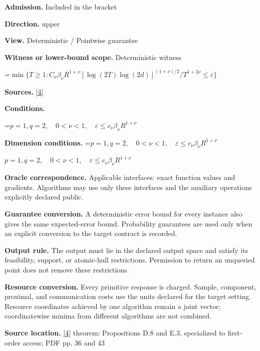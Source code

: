 \documentclass[10pt,a4paper]{article}
\newcommand{\AtlasMath}[1]{\par\begingroup\centering\setbox0=\hbox{$\displaystyle #1$}\ifdim\wd0>1.4\linewidth\typeout{ATLAS WIDE FORMULA: \the\wd0}\fi\ifdim\wd0>\linewidth\resizebox{\linewidth}{!}{\box0}\else\box0\fi\par\endgroup}
\newcommand{\AtlasInlineMath}[1]{\begingroup\setbox0=\hbox{$#1$}\ifdim\wd0>.4\linewidth\endgroup\AtlasMath{#1}\else\endgroup$#1$\fi}
\begin{document}
\textbf{Admission.} Included in the bracket



\textbf{Direction.} upper



\textbf{View.} Deterministic / Pointwise guarantee



\textbf{Witness or lower-bound scope.} Deterministic witness



\AtlasMath{\min\{T\ge1:C_\nu\beta_\nu R^{1+\nu}[\log(2T)\log(2d)]^{(1+\nu)/2}/T^{1+2\nu}\le\varepsilon\}}


\textbf{Sources.} \href{https://arxiv.org/pdf/2609.32910}{[4]}



\textbf{Conditions.}
\AtlasMath{p=1,q=2,\quad0<\nu<1,\quad\varepsilon\le c_\nu\beta_\nu R^{1+\nu}}




\textbf{Dimension conditions.} \AtlasInlineMath{p=1,q=2,\quad0<\nu<1,\quad\varepsilon\le c_\nu\beta_\nu R^{1+\nu}}



\textbf{Oracle correspondence.} Applicable interfaces: exact function values and gradients. Algorithms may use only these interfaces and the auxiliary operations explicitly declared public.



\textbf{Guarantee conversion.} A deterministic error bound for every instance also gives the same expected-error bound. Probability guarantees are used only when an explicit conversion to the target contract is recorded.



\textbf{Output rule.} The output must lie in the declared output space and satisfy its feasibility, support, or atomic-hull restrictions. Permission to return an unqueried point does not remove these restrictions.



\textbf{Resource conversion.} Every primitive response is charged. Sample, component, proximal, and communication costs use the units declared for the target setting. Resource coordinates achieved by one algorithm remain a joint vector; coordinatewise minima from different algorithms are not combined.



\textbf{Source location.} \href{https://arxiv.org/pdf/2609.32910}{[4]} theorem: Propositions D.8 and E.3, specialized to first-order access; PDF pp. 36 and 43
\end{document}

